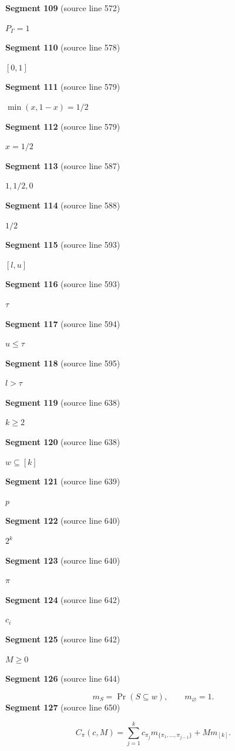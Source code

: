 \documentclass[11pt]{article}
\begin{document}
\textbf{Segment 109} (source line 572)\par
\( P_\Gamma=1 \)\par
\textbf{Segment 110} (source line 578)\par
\( [0,1] \)\par
\textbf{Segment 111} (source line 579)\par
\( \min(x,1-x)=1/2 \)\par
\textbf{Segment 112} (source line 579)\par
\( x=1/2 \)\par
\textbf{Segment 113} (source line 587)\par
\( 1,1/2,0 \)\par
\textbf{Segment 114} (source line 588)\par
\( 1/2 \)\par
\textbf{Segment 115} (source line 593)\par
\( [l,u] \)\par
\textbf{Segment 116} (source line 593)\par
\( \tau \)\par
\textbf{Segment 117} (source line 594)\par
\( u\le\tau \)\par
\textbf{Segment 118} (source line 595)\par
\( l>\tau \)\par
\textbf{Segment 119} (source line 638)\par
\( k\ge2 \)\par
\textbf{Segment 120} (source line 638)\par
\( w\subseteq[k] \)\par
\textbf{Segment 121} (source line 639)\par
\( p \)\par
\textbf{Segment 122} (source line 640)\par
\( 2^k \)\par
\textbf{Segment 123} (source line 640)\par
\( \pi \)\par
\textbf{Segment 124} (source line 642)\par
\( c_i \)\par
\textbf{Segment 125} (source line 642)\par
\( M\ge0 \)\par
\textbf{Segment 126} (source line 644)\par
\[
m_S=\Pr(S\subseteq w),\qquad m_\varnothing=1.
\]
\textbf{Segment 127} (source line 650)\par
\[
C_\pi(c,M)
 =\sum_{j=1}^k c_{\pi_j}
     m_{\{\pi_1,\ldots,\pi_{j-1}\}}
   +M m_{[k]}.
\tag{10}
\]
\end{document}
